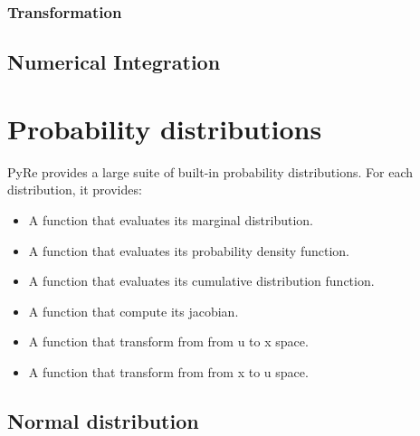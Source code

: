 \documentclass[letterpaper,10pt,english]{sphinxmanual}
\begin{document}
\subsection{Transformation}
\label{calculations:transformation}\label{calculations:module-pyre.transformation}

\section{Numerical Integration}
\label{calculations:module-pyre.quadrature}\label{calculations:numerical-integration}\label{calculations:module-pyre.integration}

\chapter{Probability distributions}
\label{distributions:chap-distributions}\label{distributions::doc}\label{distributions:probability-distributions}
PyRe provides a large suite of built-in probability distributions. For each distribution, it provides:
\begin{itemize}
\item {} 
A function that evaluates its marginal distribution.

\item {} 
A function that evaluates its probability density function.

\item {} 
A function that evaluates its cumulative distribution function.

\item {} 
A function that compute its jacobian.

\item {} 
A function that transform from from u to x space.

\item {} 
A function that transform from from x to u space.

\end{itemize}


\section{Normal distribution}
\label{distributions:normal-distribution}
\end{document}
